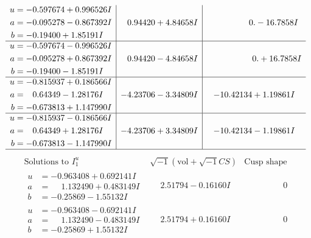 \documentclass[1p]{elsarticle_modified}
\theoremstyle{definition}
\newcommand{\I}{\sqrt{-1}}
\begin{document}
$$\begin{array}{c|c|c}
\begin{aligned}
u &= -0.597674 + 0.996526 I \\
a &= -0.095278 - 0.867392 I \\
b &= -0.19400 + 1.85191 I\end{aligned}
 & \phantom{-}0.94420 + 4.84658 I & \phantom{-0.000000 } 0. - 16.7858 I \\ \hline\begin{aligned}
u &= -0.597674 - 0.996526 I \\
a &= -0.095278 + 0.867392 I \\
b &= -0.19400 - 1.85191 I\end{aligned}
 & \phantom{-}0.94420 - 4.84658 I & \phantom{-0.000000 -}0. + 16.7858 I \\ \hline\begin{aligned}
u &= -0.815937 + 0.186566 I \\
a &= \phantom{-}0.64349 - 1.28176 I \\
b &= -0.673813 + 1.147990 I\end{aligned}
 & -4.23706 - 3.34809 I & -10.42134 + 1.19861 I \\ \hline\begin{aligned}
u &= -0.815937 - 0.186566 I \\
a &= \phantom{-}0.64349 + 1.28176 I \\
b &= -0.673813 - 1.147990 I\end{aligned}
 & -4.23706 + 3.34809 I & -10.42134 - 1.19861 I\\
 \hline 
 \end{array}$$\newpage$$\begin{array}{c|c|c}  
\text{Solutions to }I^u_{1}& \I (\text{vol} + \sqrt{-1}CS) & \text{Cusp shape}\\
 \hline 
\begin{aligned}
u &= -0.963408 + 0.692141 I \\
a &= \phantom{-}1.132490 + 0.483149 I \\
b &= -0.25869 - 1.55132 I\end{aligned}
 & \phantom{-}2.51794 - 0.16160 I & \phantom{-0.000000 } 0 \\ \hline\begin{aligned}
u &= -0.963408 - 0.692141 I \\
a &= \phantom{-}1.132490 - 0.483149 I \\
b &= -0.25869 + 1.55132 I\end{aligned}
 & \phantom{-}2.51794 + 0.16160 I & \phantom{-0.000000 } 0 \\ \hline\begin{aligned}

\end{aligned}
\end{array}$$
\end{document}
